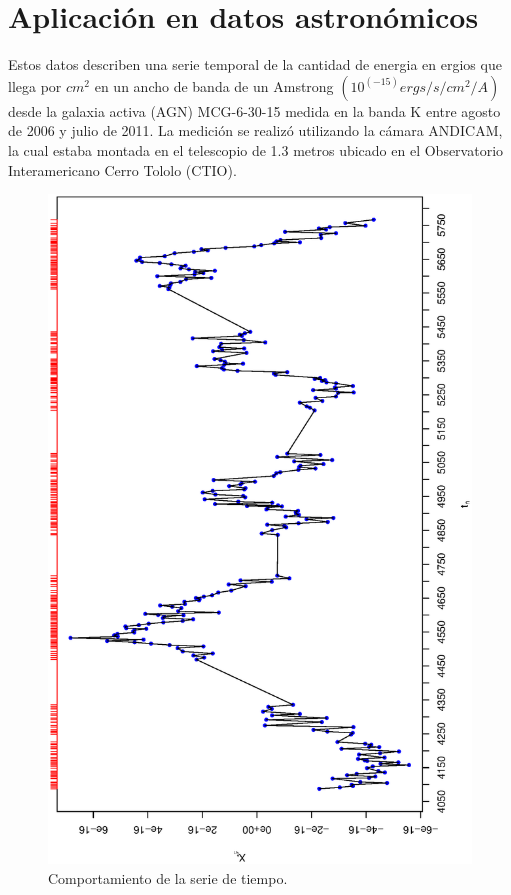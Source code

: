 \section{Aplicación en datos astronómicos}
Estos datos describen una serie temporal de la cantidad de energia en ergios que llega por $cm^2$ en un ancho de banda de un Amstrong  $(10^{(-15)} ergs/s/cm^2 /A)$ desde la galaxia activa (AGN) MCG-6-30-15 medida en la banda K entre agosto de 2006 y julio de 2011. La medición se realizó utilizando
la cámara ANDICAM, la cual estaba montada en el telescopio de 1.3 metros ubicado en el Observatorio Interamericano Cerro Tololo (CTIO).

\begin{figure}[h]
    \begin{minipage}{0.45\textwidth}
    \includegraphics[width=0.8\linewidth,angle = 270]{Kap3/Fig_Cap3/agn_data.eps}
    \caption{Comportamiento de la serie de tiempo.}
    \label{fig:example}
    \end{minipage}
    \hfill
    \begin{minipage}{0.45\textwidth}

\end{minipage}
\end{figure}
